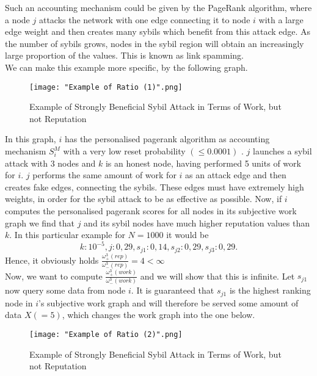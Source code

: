 \begin{example}[]
\noindent{}Such an accounting mechanism could be given by the PageRank algorithm, where a node $j$ attacks the network with one edge connecting it to node $i$ with a large edge weight and then creates many sybils which benefit from this attack edge. As the number of sybils grows, nodes in the sybil region will obtain an increasingly large proportion of the values. This is known as link spamming. \vspace{1em}\\

\noindent{}We can make this example more specific, by the following graph. 

\begin{figure}[H]
\begin{center}
\texttt{[image: "Example of Ratio (1)".png]}
\caption{Example of Strongly Beneficial Sybil Attack in Terms of Work, but not Reputation}
\label{fig:Example of Strongly Beneficial Sybil Attack in Terms of Work, but not Reputation}
\end{center}
\end{figure}

\noindent{}In this graph, $i$ has the personalised pagerank algorithm as accounting mechanism $S^M_i$ with a very low reset probability $(\leq{}0.0001)$ \cite{PageRank}. $j$ launches a sybil attack with 3 nodes and $k$ is an honest node, having performed 5 units of work for $i$. $j$ performs the same amount of work for $i$ as an attack edge and then creates fake edges, connecting the sybils. These edges must have extremely high weights, in order for the sybil attack to be as effective as possible. Now, if $i$ computes the personalised pagerank scores for all nodes in its subjective work graph we find that $j$ and its sybil nodes have much higher reputation values than $k$. In this particular example for $N=1000$ it would be 
\[
k:10^{-5}, j:0,29, s_{j1}:0,14, s_{j2}:0,29, s_{j3}:0,29.
\]
Hence, it obviously holds $\frac{\omega^3_{+}(rep)}{\omega^3_{-}(rep)} = 4 < \infty$ \vspace{1em}\\

\noindent{}Now, we want to compute $\frac{\omega^3_{+}(work)}{\omega^3_{-}(work)}$ and we will show that this is infinite. Let $s_{j1}$ now query some data from node $i$. It is guaranteed that $s_{j1}$ is the highest ranking node in $i$'s subjective work graph and will therefore be served some amount of data $X(=5)$, which changes the work graph into the one below. 

\begin{figure}[H]
\begin{center}
\texttt{[image: "Example of Ratio (2)".png]}
\caption{Example of Strongly Beneficial Sybil Attack in Terms of Work, but not Reputation}
\label{fig:Example of Strongly Beneficial Sybil Attack in Terms of Work, but not Reputation (2)}
\end{center}
\end{figure}


\end{example}
